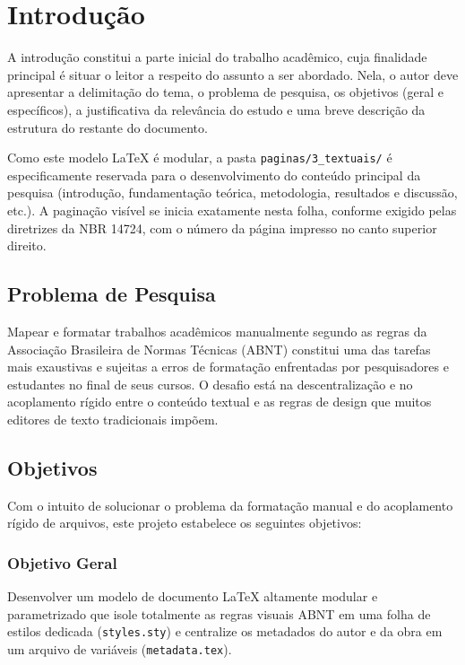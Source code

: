 
\chapter{Introdução}

A introdução constitui a parte inicial do trabalho acadêmico, cuja finalidade principal é situar o leitor a respeito do assunto a ser abordado. Nela, o autor deve apresentar a delimitação do tema, o problema de pesquisa, os objetivos (geral e específicos), a justificativa da relevância do estudo e uma breve descrição da estrutura do restante do documento.

Como este modelo LaTeX é modular, a pasta \texttt{paginas/3\_textuais/} é especificamente reservada para o desenvolvimento do conteúdo principal da pesquisa (introdução, fundamentação teórica, metodologia, resultados e discussão, etc.). A paginação visível se inicia exatamente nesta folha, conforme exigido pelas diretrizes da NBR 14724, com o número da página impresso no canto superior direito.

\section{Problema de Pesquisa}

Mapear e formatar trabalhos acadêmicos manualmente segundo as regras da Associação Brasileira de Normas Técnicas (ABNT) constitui uma das tarefas mais exaustivas e sujeitas a erros de formatação enfrentadas por pesquisadores e estudantes no final de seus cursos. O desafio está na descentralização e no acoplamento rígido entre o conteúdo textual e as regras de design que muitos editores de texto tradicionais impõem. 

\section{Objetivos}

Com o intuito de solucionar o problema da formatação manual e do acoplamento rígido de arquivos, este projeto estabelece os seguintes objetivos:

\subsection{Objetivo Geral}
Desenvolver um modelo de documento LaTeX altamente modular e parametrizado que isole totalmente as regras visuais ABNT em uma folha de estilos dedicada (\texttt{styles.sty}) e centralize os metadados do autor e da obra em um arquivo de variáveis (\texttt{metadata.tex}).

